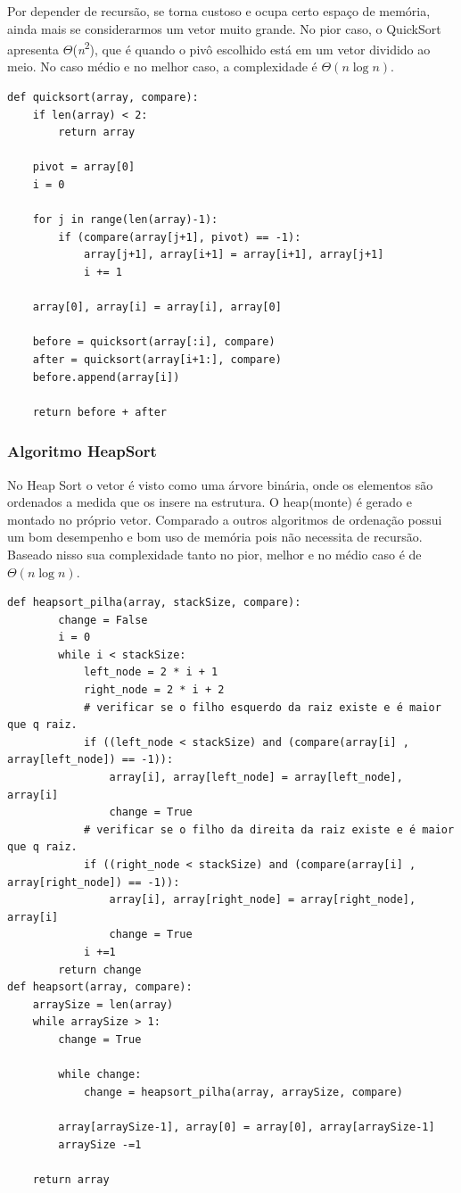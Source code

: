 \documentclass[a4paper,12pt]{scrartcl}
\begin{document}
Por depender de recursão, se torna custoso e ocupa certo espaço de memória, ainda mais se considerarmos um vetor muito grande. No pior caso, o QuickSort apresenta $\Theta$(\textit{n}\textsuperscript{2}), que é quando o pivô escolhido está em um vetor dividido ao meio. No caso médio e no melhor caso, a complexidade é $\Theta(\textit{n} \log \textit{n})$.

\begin{lstlisting}
def quicksort(array, compare):
    if len(array) < 2:
        return array

    pivot = array[0]
    i = 0
    
    for j in range(len(array)-1):
        if (compare(array[j+1], pivot) == -1):
            array[j+1], array[i+1] = array[i+1], array[j+1]
            i += 1
    
    array[0], array[i] = array[i], array[0]

    before = quicksort(array[:i], compare)
    after = quicksort(array[i+1:], compare)
    before.append(array[i])
    
    return before + after
\end{lstlisting}

\subsubsection{Algoritmo HeapSort}
No Heap Sort o vetor é visto como uma árvore binária, onde os elementos são ordenados a medida que os insere na estrutura. O heap(monte) é gerado e montado no próprio vetor.
Comparado a outros algoritmos de ordenação possui um bom desempenho e bom uso de memória pois não necessita de recursão. Baseado nisso sua complexidade tanto no pior, melhor e no médio caso é de $\Theta(\textit{n} \log \textit{n})$.

\begin{lstlisting}
def heapsort_pilha(array, stackSize, compare):
        change = False
        i = 0
        while i < stackSize:
            left_node = 2 * i + 1
            right_node = 2 * i + 2
            # verificar se o filho esquerdo da raiz existe e é maior que q raiz.
            if ((left_node < stackSize) and (compare(array[i] , array[left_node]) == -1)):
                array[i], array[left_node] = array[left_node], array[i]
                change = True
            # verificar se o filho da direita da raiz existe e é maior que q raiz. 
            if ((right_node < stackSize) and (compare(array[i] , array[right_node]) == -1)):
                array[i], array[right_node] = array[right_node], array[i]
                change = True
            i +=1
        return change
def heapsort(array, compare):
    arraySize = len(array)
    while arraySize > 1:
        change = True
        
        while change:
            change = heapsort_pilha(array, arraySize, compare)
        
        array[arraySize-1], array[0] = array[0], array[arraySize-1]
        arraySize -=1
    
    return array

\end{lstlisting}
\end{document}
